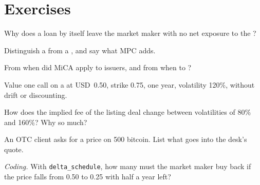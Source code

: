\section{Exercises}

\begin{exercise}[$\star$]\label{exo:m3:the-crypto-trading-business:1}
Why does a  loan by itself leave the market maker with no net exposure to the ?
\end{exercise}

\begin{exercise}[$\star$]\label{exo:m3:the-crypto-trading-business:2}
Distinguish a  from a , and say what MPC adds.
\end{exercise}

\begin{exercise}[$\star$]\label{exo:m3:the-crypto-trading-business:3}
From when did MiCA apply to  issuers, and from when to ?
\end{exercise}

\begin{exercise}[$\star\star$]\label{exo:m3:the-crypto-trading-business:4}
Value one call on a  at USD~0.50, strike 0.75, one year, volatility 120\%, without drift or discounting.
\end{exercise}

\begin{exercise}[$\star\star$]\label{exo:m3:the-crypto-trading-business:5}
How does the implied fee of the listing deal change between volatilities of 80\% and 160\%? Why so much?
\end{exercise}

\begin{exercise}[$\star\star$]\label{exo:m3:the-crypto-trading-business:6}
An OTC client asks for a price on 500 bitcoin. List what goes into the desk's quote.
\end{exercise}

\begin{exercise}[$\star\star\star$]\label{exo:m3:the-crypto-trading-business:7}
\emph{Coding.} With \texttt{delta\_schedule}, how many  must the market maker buy back if the price falls from 0.50 to 0.25 with half a year left?
\end{exercise}

